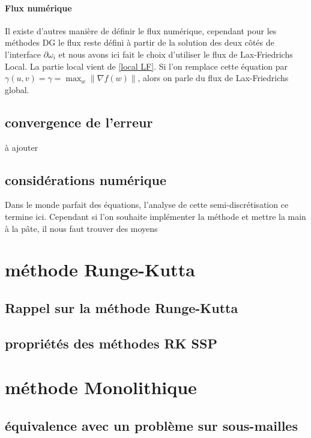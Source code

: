 \documentclass[11pt]{article}%
\begin{document}
\paragraph{Flux numérique\\}
Il existe d'autres manière de définir le flux numérique, 
cependant pour les méthodes DG le flux reste défini à partir de la solution des deux côtés de l'interface $\partial\omega_i$ 
et nous avons ici fait le choix d'utiliser le flux de Lax-Friedrichs Local. La partie local vient de \eqref{local LF}. 
Si l'on remplace cette équation par $\gamma(u,v)= \gamma = \max_w \|\nabla f(w) \|$, alors on parle du flux de Lax-Friedrichs global.

\subsection{convergence de l'erreur}
{\color{red} à ajouter}

\subsection{considérations numérique}
Dans le monde parfait des équations, l'analyse de cette semi-discrétisation ce termine ici. Cependant si l'on souhaite implémenter la méthode et mettre la main à la pâte, il nous faut trouver des moyens  


\section{méthode Runge-Kutta}
\subsection{Rappel sur la méthode Runge-Kutta}
\subsection{propriétés des méthodes RK SSP}

\section{méthode Monolithique}
\subsection{équivalence avec un problème sur sous-mailles}
\end{document}
